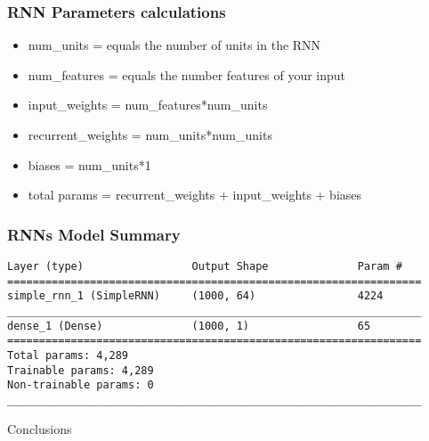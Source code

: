 \begin{frame}[fragile] \frametitle{RNN Parameters calculations}

\begin{itemize}
\item num\_units = equals the number of units in the RNN
\item num\_features = equals the number features of your input
\item input\_weights = num\_features*num\_units
\item recurrent\_weights = num\_units*num\_units
\item biases = num\_units*1
\item total params = recurrent\_weights + input\_weights + biases
\end{itemize}



\end{frame}

\begin{frame}[fragile] \frametitle{RNNs Model Summary}
\begin{lstlisting}
Layer (type)                 Output Shape              Param #   
=================================================================
simple_rnn_1 (SimpleRNN)     (1000, 64)                4224      
_________________________________________________________________
dense_1 (Dense)              (1000, 1)                 65        
=================================================================
Total params: 4,289
Trainable params: 4,289
Non-trainable params: 0
_________________________________________________________________
\end{lstlisting}




\end{frame}





\begin{frame}
  \begin{center}
    {\Large Conclusions}
  \end{center}
\end{frame}


